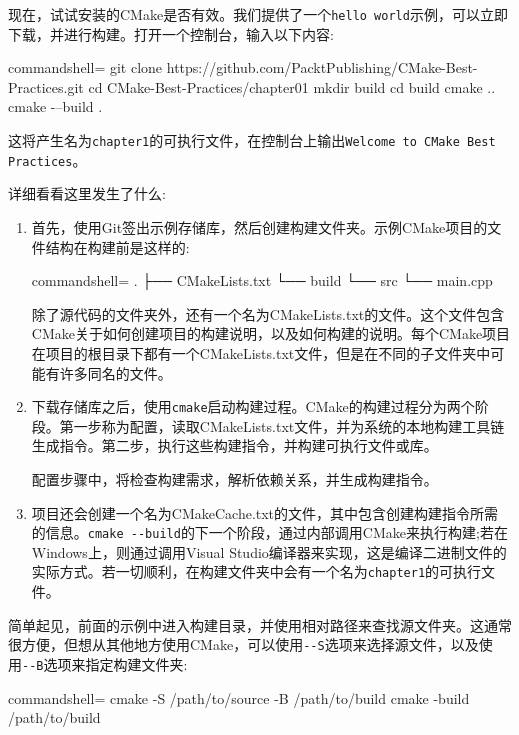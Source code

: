 现在，试试安装的CMake是否有效。我们提供了一个\texttt{hello world}示例，可以立即下载，并进行构建。打开一个控制台，输入以下内容:

\begin{tcblisting}{commandshell={}}
git clone https://github.com/PacktPublishing/CMake-Best-Practices.git
cd CMake-Best-Practices/chapter01
mkdir build
cd build
cmake ..
cmake -–build .
\end{tcblisting}

这将产生名为\texttt{chapter1}的可执行文件，在控制台上输出\texttt{Welcome to CMake Best Practices}。

详细看看这里发生了什么:

\begin{enumerate}
\item 
首先，使用Git签出示例存储库，然后创建构建文件夹。示例CMake项目的文件结构在构建前是这样的:

\begin{tcblisting}{commandshell={}}
.
├── CMakeLists.txt
└── build
└── src
      └── main.cpp
\end{tcblisting}

除了源代码的文件夹外，还有一个名为CMakeLists.txt的文件。这个文件包含CMake关于如何创建项目的构建说明，以及如何构建的说明。每个CMake项目在项目的根目录下都有一个CMakeLists.txt文件，但是在不同的子文件夹中可能有许多同名的文件。

\item 
下载存储库之后，使用\texttt{cmake}启动构建过程。CMake的构建过程分为两个阶段。第一步称为配置，读取CMakeLists.txt文件，并为系统的本地构建工具链生成指令。第二步，执行这些构建指令，并构建可执行文件或库。

配置步骤中，将检查构建需求，解析依赖关系，并生成构建指令。

\item 
项目还会创建一个名为CMakeCache.txt的文件，其中包含创建构建指令所需的信息。\texttt{cmake -{}-build}的下一个阶段，通过内部调用CMake来执行构建;若在Windows上，则通过调用Visual Studio编译器来实现，这是编译二进制文件的实际方式。若一切顺利，在构建文件夹中会有一个名为\texttt{chapter1}的可执行文件。
\end{enumerate}

简单起见，前面的示例中进入构建目录，并使用相对路径来查找源文件夹。这通常很方便，但想从其他地方使用CMake，可以使用\texttt{-{}-S}选项来选择源文件，以及使用\texttt{-{}-B}选项来指定构建文件夹:

\begin{tcblisting}{commandshell={}}
cmake -S /path/to/source -B /path/to/build
cmake -build /path/to/build
\end{tcblisting}

